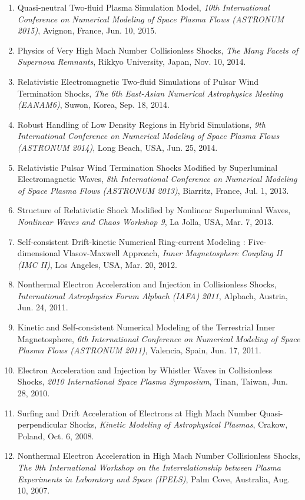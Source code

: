 \documentclass[lualatex,a4paper,ja=standard]{scrartcl}
\newcommand{\TalkEntry}[3]{
\item #1, \textit{#2}, #3.}
\begin{document}
\begin{enumerate}
	\TalkEntry
	{Quasi-neutral Two-fluid Plasma Simulation Model}
	{10th International Conference on Numerical Modeling of Space Plasma Flows (ASTRONUM 2015)}
	{Avignon, France, Jun. 10, 2015}

	\TalkEntry
	{Physics of Very High Mach Number Collisionless Shocks}
	{The Many Facets of Supernova Remnants}
	{Rikkyo University, Japan, Nov. 10, 2014}

	\TalkEntry
	{Relativistic Electromagnetic Two-fluid Simulations of Pulsar Wind Termination Shocks}
	{The 6th East-Asian Numerical Astrophysics Meeting (EANAM6)}
	{Suwon, Korea, Sep. 18, 2014}

	\TalkEntry
	{Robust Handling of Low Density Regions in Hybrid Simulations}
	{9th International Conference on Numerical Modeling of Space Plasma Flows (ASTRONUM 2014)}
	{Long Beach, USA, Jun. 25, 2014}

	\TalkEntry
	{Relativistic Pulsar Wind Termination Shocks Modified by Superluminal Electromagnetic Waves}
	{8th International Conference on Numerical Modeling of Space Plasma Flows (ASTRONUM 2013)}
	{Biarritz, France, Jul. 1, 2013}

	\TalkEntry
	{Structure of Relativistic Shock Modified by Nonlinear Superluminal Waves}
	{Nonlinear Waves and Chaos Workshop 9}
	{La Jolla, USA, Mar. 7, 2013}

	\TalkEntry
	{Self-consistent Drift-kinetic Numerical Ring-current Modeling : Five-dimensional Vlasov-Maxwell Approach}
	{Inner Magnetosphere Coupling II (IMC II)}
	{Los Angeles, USA, Mar. 20, 2012}

	\TalkEntry
	{Nonthermal Electron Acceleration and Injection in Collisionless Shocks}
	{International Astrophysics Forum Alpbach (IAFA) 2011}
	{Alpbach, Austria, Jun. 24, 2011}

	\TalkEntry
	{Kinetic and Self-consistent Numerical Modeling of the Terrestrial Inner Magnetosphere}
	{6th International Conference on Numerical Modeling of Space Plasma Flows (ASTRONUM 2011)}
	{Valencia, Spain, Jun. 17, 2011}

	\TalkEntry
	{Electron Acceleration and Injection by Whistler Waves in Collisionless Shocks}
	{2010 International Space Plasma Symposium}
	{Tinan, Taiwan, Jun. 28, 2010}

	\TalkEntry
	{Surfing and Drift Acceleration of Electrons at High Mach Number Quasi-perpendicular Shocks}
	{Kinetic Modeling of Astrophysical Plasmas}
	{Crakow, Poland, Oct. 6, 2008}

	\TalkEntry
	{Nonthermal Electron Acceleration in High Mach Number Collisionless Shocks}
	{The 9th International Workshop on the Interrelationship between Plasma Experiments in Laboratory and Space (IPELS)}
	{Palm Cove, Australia, Aug. 10, 2007}

\end{enumerate}
\end{document}
